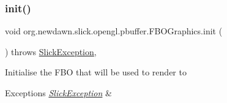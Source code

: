 \subsubsection{\texorpdfstring{init()}{init()}}
{\footnotesize\ttfamily void org.\+newdawn.\+slick.\+opengl.\+pbuffer.\+F\+B\+O\+Graphics.\+init (\begin{DoxyParamCaption}{ }\end{DoxyParamCaption}) throws \mbox{\hyperlink{classorg_1_1newdawn_1_1slick_1_1_slick_exception}{Slick\+Exception}}\hspace{0.3cm}{\ttfamily [inline]}, {\ttfamily [private]}}

Initialise the F\+BO that will be used to render to


\begin{DoxyExceptions}{Exceptions}
{\em \mbox{\hyperlink{classorg_1_1newdawn_1_1slick_1_1_slick_exception}{Slick\+Exception}}} & \\
\hline
\end{DoxyExceptions}

